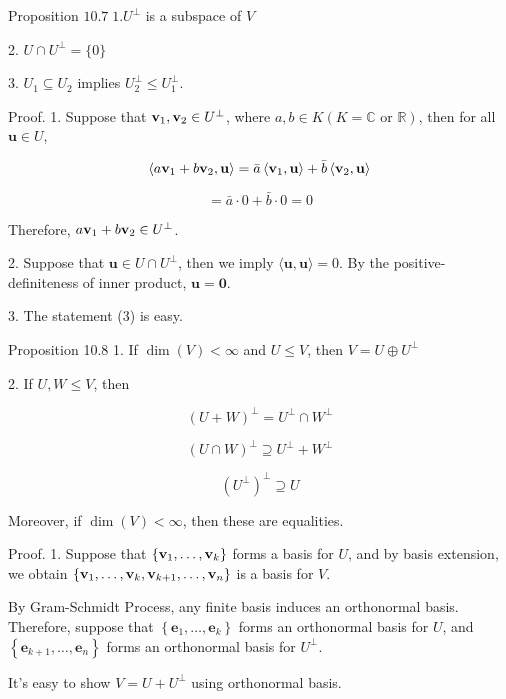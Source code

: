 \documentclass[11pt]{article}
\begin{document}
Proposition \({10.7}\;1.{U}^{ \bot  }\) is a subspace of \(V\)

2. \(U \cap  {U}^{ \bot  } = \{ 0\}\)

3. \({U}_1 \subseteq  {U}_2\) implies \({U}_2^{ \bot  } \leq  {U}_1^{ \bot  }\).

Proof. 1. Suppose that \({\bf v}_1,{\bf v}_2 \in  {U}^{ \bot  }\), where \(a,b \in  K\left( {K = \mathbb{C}\text{ or }\mathbb{R}}\right)\), then for all \(\mathbf{u} \in  U\),

\[
\left\langle  {a{\bf v}_1 + b{\bf v}_2,\mathbf{u}}\right\rangle   = \bar{a}\left\langle  {{\bf v}_1,\mathbf{u}}\right\rangle   + \bar{b}\left\langle  {{\bf v}_2,\mathbf{u}}\right\rangle
\]

\[
= \bar{a} \cdot  0 + \bar{b} \cdot  0 = 0
\]

Therefore, \(a{\bf v}_1 + b{\bf v}_2 \in  {U}^{ \bot  }\).

2. Suppose that \(\mathbf{u} \in  U \cap  {U}^{ \bot  }\), then we imply \(\langle \mathbf{u},\mathbf{u}\rangle  = 0\). By the positive-definiteness of inner product, \(\mathbf{u} = \mathbf{0}\).

3. The statement (3) is easy.

Proposition 10.8 1. If \(\dim \left( V\right)  < \infty\) and \(U \leq  V\), then \(V = U \oplus  {U}^{ \bot  }\)

2. If \(U,W \leq  V\), then

\[
{\left( U + W\right) }^{ \bot  } = {U}^{ \bot  } \cap  {W}^{ \bot  }
\]

\[
{\left( U \cap  W\right) }^{ \bot  } \supseteq  {U}^{ \bot  } + {W}^{ \bot  }
\]

\[
{\left( {U}^{ \bot  }\right) }^{ \bot  } \supseteq  U
\]

Moreover, if \(\dim \left( V\right)  < \infty\), then these are equalities.

Proof. 1. Suppose that \(\left\{  {{\bf v}_1,\ldots ,{\bf v}_{k}}\right\}\) forms a basis for \(U\), and by basis extension, we obtain \(\left\{  {{\bf v}_1,\ldots ,{\bf v}_{k},{\bf v}_{k + 1},\ldots ,{\bf v}_n}\right\}\) is a basis for \(V\).

By Gram-Schmidt Process, any finite basis induces an orthonormal basis. Therefore, suppose that \(\left\{  {{\mathbf{e}}_1,\ldots ,{\mathbf{e}}_{k}}\right\}\) forms an orthonormal basis for \(U\), and \(\left\{  {{\mathbf{e}}_{k + 1},\ldots ,{\mathbf{e}}_n}\right\}\) forms an orthonormal basis for \({U}^{ \bot  }\).

It’s easy to show \(V = U + {U}^{ \bot  }\) using orthonormal basis.
\end{document}
